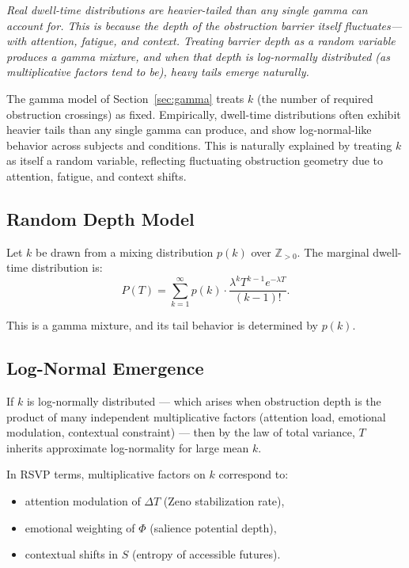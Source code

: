 \documentclass[12pt,a4paper]{article}
\begin{document}
\textit{Real dwell-time distributions are heavier-tailed than any single gamma can account for. This is because the depth of the obstruction barrier itself fluctuates---with attention, fatigue, and context. Treating barrier depth as a random variable produces a gamma mixture, and when that depth is log-normally distributed (as multiplicative factors tend to be), heavy tails emerge naturally.}

The gamma model of Section~\ref{sec:gamma} treats $k$ (the number of required obstruction crossings) as fixed. Empirically, dwell-time distributions often exhibit heavier tails than any single gamma can produce, and show log-normal-like behavior across subjects and conditions. This is naturally explained by treating $k$ as itself a random variable, reflecting fluctuating obstruction geometry due to attention, fatigue, and context shifts.

\subsection{Random Depth Model}

Let $k$ be drawn from a mixing distribution $p(k)$ over $\mathbb{Z}_{>0}$. The marginal dwell-time distribution is:
\[
P(T) = \sum_{k=1}^{\infty} p(k) \cdot \frac{\lambda^k T^{k-1} e^{-\lambda T}}{(k-1)!}.
\]

This is a gamma mixture, and its tail behavior is determined by $p(k)$.

\subsection{Log-Normal Emergence}

If $k$ is log-normally distributed --- which arises when obstruction depth is the product of many independent multiplicative factors (attention load, emotional modulation, contextual constraint) --- then by the law of total variance, $T$ inherits approximate log-normality for large mean $k$.

In RSVP terms, multiplicative factors on $k$ correspond to:
\begin{itemize}[noitemsep]
\item attention modulation of $\Delta T$ (Zeno stabilization rate),
\item emotional weighting of $\Phi$ (salience potential depth),
\item contextual shifts in $S$ (entropy of accessible futures).
\end{itemize}
\end{document}
